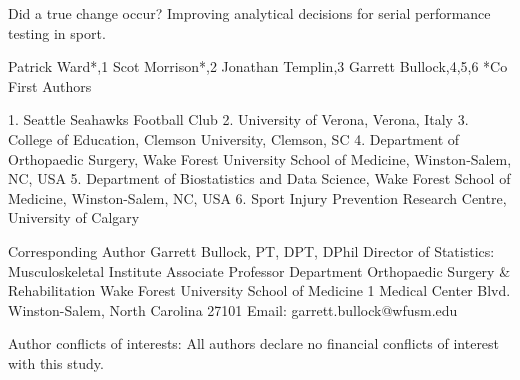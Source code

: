 Did a true change occur? Improving analytical decisions for serial performance testing in sport. 

Patrick Ward*,1 Scot Morrison*,2 Jonathan Templin,3 Garrett Bullock,4,5,6 
*Co First Authors

1.	Seattle Seahawks Football Club
2.	University of Verona, Verona, Italy
3.	College of Education, Clemson University, Clemson, SC
4.	Department of Orthopaedic Surgery, Wake Forest University School of Medicine, Winston‑Salem, NC, USA
5.	Department of Biostatistics and Data Science, Wake Forest School of Medicine, Winston-Salem, NC, USA
6.	Sport Injury Prevention Research Centre, University of Calgary

Corresponding Author 
Garrett Bullock, PT, DPT, DPhil
Director of Statistics: Musculoskeletal Institute
Associate Professor 
Department Orthopaedic Surgery & Rehabilitation 
Wake Forest University School of Medicine 
1 Medical Center Blvd.
Winston-Salem, North Carolina 27101
Email: garrett.bullock@wfusm.edu

Author conflicts of interests: All authors declare no financial conflicts of interest with this study. 
